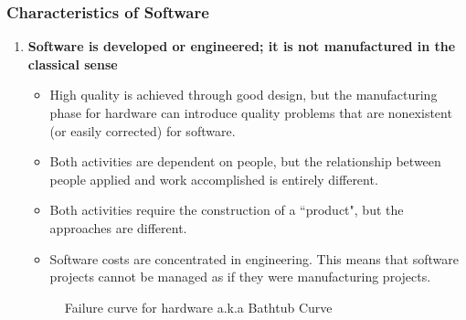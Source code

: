 \documentclass{article}
\begin{document}
	\subsubsection{Characteristics of Software}
	\begin{enumerate}[label=\arabic*.]
		\item \textbf{Software is developed or engineered; it is not manufactured in the classical sense}
			\begin{itemize}
				\item High quality is achieved through good design, but the manufacturing phase for hardware
					can introduce quality problems that are nonexistent (or easily corrected) for software.
				\item Both activities are dependent on people, but the relationship between people applied and
					work accomplished is entirely different.
				\item Both activities require the construction of a ``product", but the approaches are
					different.
				\item Software costs are concentrated in engineering. This means that software projects cannot
					be managed as if they were manufacturing projects.
			\end{itemize}
		\begin{figure}[H]
			\centering
			
			\caption{Failure curve for hardware a.k.a Bathtub Curve}
		\end{figure} \newpage


\end{enumerate}
\end{document}

